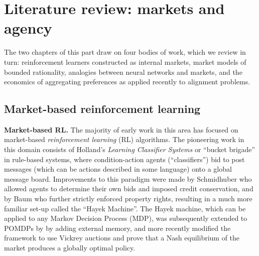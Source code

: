 \chapter{Literature review: markets and agency}\label{ch:litrev-agency}

\begin{draftblock}
\noindent The two chapters of this part draw on four bodies of work, which we review in turn: reinforcement learners constructed as internal markets, market models of bounded rationality, analogies between neural networks and markets, and the economics of aggregating preferences as applied recently to alignment problems.
\end{draftblock}

\section{Market-based reinforcement learning}\label{litrev:sec:marketrl}
\label{mba/sec:related}
\textbf{Market-based RL.} The majority of early work in this area has focused on market-based \emph{reinforcement learning} (RL) algorithms. The pioneering work in this domain consists of Holland's \emph{Learning Classifier Systems} or ``bucket brigade'' \citep{hollandPropertiesBucketBrigade1985a} in rule-based systems, where condition-action agents (``classifiers'') bid to post messages (which can be actions described in some language) onto a global message board. Improvements to this paradigm were made by Schmidhuber \citep{schmidhuberEvolutionaryPrinciplesSelfreferential1987, schmidhuberLocalLearningAlgorithm1989} who allowed agents to determine their own bids and imposed credit conservation, and by Baum \citep{baumModelIntelligenceEconomy1999} who further strictly enforced property rights, resulting in a much more familiar set-up called the ``Hayek Machine''. The Hayek machine, which can be applied to any Markov Decision Process (MDP), was subsequently extended to POMDPs by \citet{kweeMarketBasedReinforcementLearning2001} by adding external memory, and more recently \citep{changDecentralizedReinforcementLearning2020} modified the framework to use Vickrey auctions and prove that a Nash equilibrium of the market produces a globally optimal policy.



